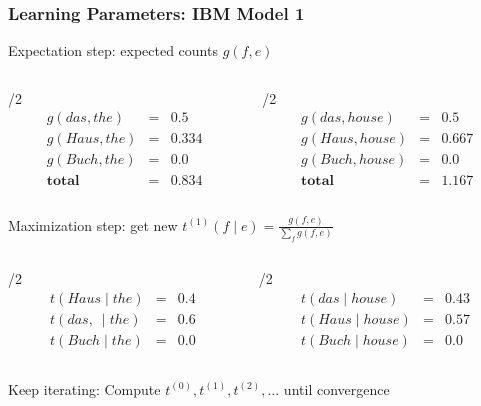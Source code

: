 \begin{frame}
\frametitle{Learning Parameters: IBM Model 1}

\begin{block}{Expectation step: expected counts $g(f,e)$}

\begin{columns}

\begin{column}{\textwidth/2}
\[
\begin{array}{lcl}
g(das, the) & = & 0.5 \\
g(Haus, the) & = & 0.334 \\
g(Buch, the) & = & 0.0 \\
\textbf{total} & = & 0.834
\end{array}
\]

\end{column}

\begin{column}{\textwidth/2}
\[
\begin{array}{lcl}
g(das, house) & = & 0.5 \\
g(Haus, house) & = & 0.667 \\
g(Buch, house) & = & 0.0 \\
\textbf{total} & = & 1.167
 \end{array}
\]

\end{column}

\end{columns}

\end{block}\pause

\begin{block}{Maximization step: get new $t^{(1)}(f \mid e) = \frac{ g(f,e) }{ \sum_f g(f,e) } $}

\begin{columns}

\begin{column}{\textwidth/2}
\[
\begin{array}{lcl}
t(Haus \mid the) & = & 0.4 \\
t(das,\ \mid the) & = & 0.6 \\
t(Buch \mid the) & = & 0.0 
\end{array}
\]

\end{column}

\begin{column}{\textwidth/2}
\[
\begin{array}{lcl}
t(das \mid house) & = & 0.43 \\
t(Haus \mid house) & = & 0.57 \\
t(Buch \mid house) & = & 0.0 
\end{array}
\]

\end{column}

\end{columns}

Keep iterating: Compute $t^{(0)}, t^{(1)}, t^{(2)}, \ldots$ until convergence
\end{block}

\end{frame}


